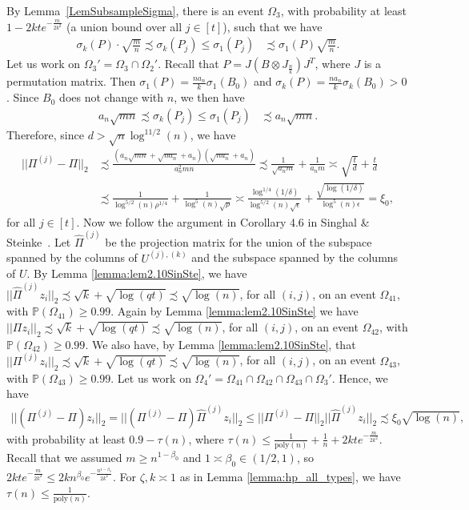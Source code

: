 \documentclass{article}
\begin{document}
By Lemma~\ref{LemSubsampleSigma}, there is an event $\Omega_3$, with probability at least $1 - 2kte^{-\frac{m}{2k^2}}$ (a union bound over all $j \in [t]$), such that we have
\begin{align*}
\sigma_k(P) \cdot \sqrt{\frac{m}{n}} \precsim \sigma_{k}(P_j) \leq \sigma_{1}(P_j) & \precsim \sigma_1(P) \sqrt{\frac{m}{n}}.
\end{align*}
Let us work on $\Omega_3' = \Omega_3 \cap \Omega_2'$. Recall that $P = J(B \otimes J_{\frac{n}{k}})J^T$, where $J$ is a permutation matrix. Then $\sigma_1(P) = \frac{na_n}{k}\sigma_1(B_0)$ and $\sigma_k(P) = \frac{na_n}{k}\sigma_k(B_0) > 0$. Since $B_0$ does not change with $n$, we then have
\begin{align*}
a_n \sqrt{mn} \precsim \sigma_{k}(P_j) \leq \sigma_{1}(P_j) & \precsim a_n \sqrt{mn}.
\end{align*}
Therefore, since $d > \sqrt{n}\log^{11/2}(n)$, we have 
\begin{align*}
||\Pi^{(j)} - \Pi||_2 &\precsim \frac{(a_n \sqrt{mn} + \sqrt{na_n} + a_n)(\sqrt{na_n} + a_n)}{a_n^2mn} \precsim \frac{1}{\sqrt{a_nm}} + \frac{1}{a_nm} \asymp \sqrt{\frac{t}{d}} + \frac{t}{d}\\
&\precsim \frac{1}{\log^{5/2}(n)\rho^{1/4}} + \frac{1}{\log^5(n)\sqrt{\rho}} \asymp \frac{\log^{1/4}(1/\delta)}{\log^{5/2}(n)\sqrt{\epsilon}} + \frac{\sqrt{\log(1/\delta)}}{\log^5(n)\epsilon} = \xi_0,
\end{align*}
for all $j \in [t]$. Now we follow the argument in Corollary 4.6 in Singhal \& Steinke~\cite{SinSte21}.
Let $\hat{\Pi}^{(j)}$ be the projection matrix for the union of the subspace spanned by the columns of $U^{(j), (k)}$ and the subspace spanned
by the columns of $U$. By Lemma \ref{lemma:lem2.10SinSte}, we have $||\hat{\Pi}^{(j)}z_i||_2 \precsim \sqrt{k} + \sqrt{\log(qt)} \precsim \sqrt{\log(n)}$, for all $(i, j)$, on an event $\Omega_{41}$, with $\mathbb{P}(\Omega_{41}) \geq 0.99$. Again by Lemma \ref{lemma:lem2.10SinSte} we have $||\Pi z_i||_2 \precsim \sqrt{k} + \sqrt{\log(qt)} \precsim \sqrt{\log(n)}$, for all $(i, j)$, on an event $\Omega_{42}$, with $\mathbb{P}(\Omega_{42}) \geq 0.99$. We also have, by Lemma \ref{lemma:lem2.10SinSte}, that $||\Pi^{(j)}z_i||_2 \precsim \sqrt{k} + \sqrt{\log(qt)} \precsim \sqrt{\log(n)}$, for all $(i, j)$, on an event $\Omega_{43}$, with $\mathbb{P}(\Omega_{43}) \geq 0.99$. Let us work on $\Omega_4' = \Omega_{41} \cap \Omega_{42} \cap \Omega_{43} \cap \Omega_3'$. Hence, we have
\begin{align*}
||(\Pi^{(j)} - \Pi)z_i||_2 = ||(\Pi^{(j)} - \Pi)\hat{\Pi}^{(j)}z_i||_2 \leq ||\Pi^{(j)} - \Pi||_2||\hat{\Pi}^{(j)}z_i||_2 \precsim \xi_0 \sqrt{\log(n)},
\end{align*}
with probability at least $0.9 - \tau(n)$, where $\tau(n) \le \frac{1}{\mathrm{poly}(n)} + \frac{1}{n} + 2kte^{-\frac{m}{2k^2}}$. Recall that we assumed $m \geq n^{1 - \beta_0}$ and $1 \asymp \beta_0 \in (1/2, 1)$, so $2kte^{-\frac{m}{2k^2}} \leq 2kn^{\beta_0}e^{-\frac{n^{1 - \beta_0}}{2k^2}}$. For $\zeta, k \asymp 1$ as in Lemma \ref{lemma:hp_all_types}, we have $\tau(n) \leq \frac{1}{\mathrm{poly}(n)}$.
\end{document}
